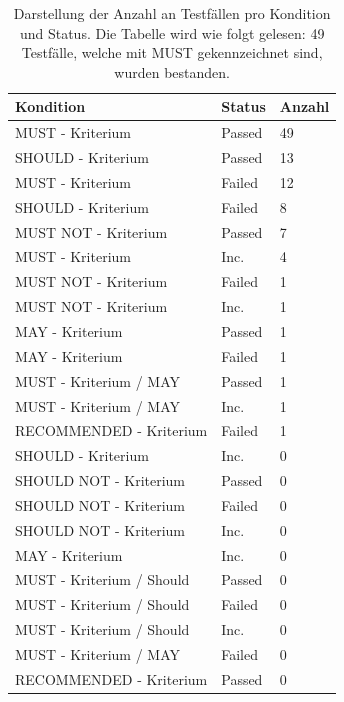 \documentclass[a4paper]{book}
\begin{document}
\begin{large}
\begin{onehalfspace}
\begin{footnotesize}
\begin{table}[t]
\centering

\begin{tabular}{lll}
\textbf{Kondition}                    & \textbf{Status} & \textbf{Anzahl} \\
\hline
MUST - Kriterium             & Passed & 49     \\
SHOULD  - Kriterium          & Passed & 13     \\
MUST - Kriterium             & Failed & 12     \\
SHOULD  - Kriterium          & Failed & 8      \\
MUST NOT - Kriterium         & Passed & 7      \\
MUST   - Kriterium           & Inc.   & 4      \\
MUST NOT - Kriterium         & Failed & 1      \\
MUST   NOT - Kriterium       & Inc.   & 1      \\
MAY - Kriterium              & Passed & 1      \\
MAY   - Kriterium            & Failed & 1      \\
MUST - Kriterium / MAY       & Passed & 1      \\
MUST   - Kriterium / MAY     & Inc.   & 1      \\
RECOMMENDED  -    Kriterium  & Failed & 1      \\
SHOULD  - Kriterium          & Inc.   & 0      \\
SHOULD NOT  -    Kriterium   & Passed & 0      \\
SHOULD   NOT  -    Kriterium & Failed & 0      \\
SHOULD NOT  -    Kriterium   & Inc.   & 0      \\
MAY   - Kriterium            & Inc.   & 0      \\
MUST - Kriterium / Should    & Passed & 0      \\
MUST   - Kriterium / Should  & Failed & 0      \\
MUST - Kriterium / Should    & Inc.   & 0      \\
MUST   - Kriterium / MAY     & Failed & 0      \\
RECOMMENDED  -    Kriterium  & Passed & 0     
\end{tabular}
\caption{Darstellung der Anzahl an Testfällen pro Kondition und Status. Die Tabelle wird wie folgt gelesen: 49 Testfälle, welche mit \glqq MUST\grqq{} gekennzeichnet sind, wurden bestanden.}
\end{table}
\end{footnotesize}


\end{onehalfspace}
\end{large}
\end{document}
